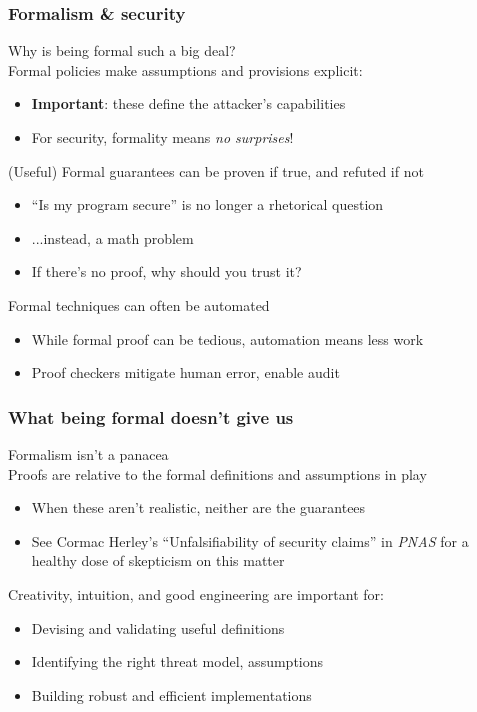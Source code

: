 \documentclass[10pt,handout]{beamer}
\begin{document}
\begin{frame}

\frametitle{Formalism \& security}

Why is being formal such a big deal?
\\[1em]

Formal policies make assumptions and provisions explicit:
\begin{itemize}
  \item \textbf{Important}: these define the attacker's capabilities
  \item For security, formality means \emph{no surprises}! \\[1em]
\end{itemize}

(Useful) Formal guarantees can be proven if true, and refuted if not
\begin{itemize}
  \item ``Is my program secure'' is no longer a rhetorical question
  \item ...instead, a math problem
  \item If there's no proof, why should you trust it? \\[1em]
\end{itemize}

Formal techniques can often be automated
\begin{itemize}
  \item While formal proof can be tedious, automation means less work
  \item Proof checkers mitigate human error, enable audit
\end{itemize}

\end{frame}


\begin{frame}

\frametitle{What being formal doesn't give us}

Formalism isn't a panacea
\\[1em]

\pause
Proofs are relative to the formal definitions and assumptions in play
\begin{itemize}
  \item When these aren't realistic, neither are the guarantees
  \item See Cormac Herley's ``Unfalsifiability of security claims'' in \emph{PNAS} for a healthy dose of skepticism on this matter \\[1em]
\end{itemize}

\pause
Creativity, intuition, and good engineering are important for:
\begin{itemize}
  \item Devising and validating useful definitions
  \item Identifying the right threat model, assumptions
  \item Building robust and efficient implementations
\end{itemize}

\end{frame}
\end{document}

